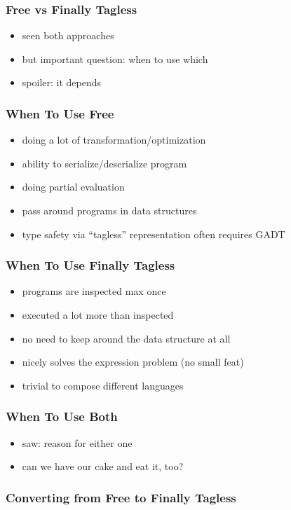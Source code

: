 \documentclass[aspectratio=169, hyperref={colorlinks, linkcolor=beamer@centricgreen}, urlcolor=links]{beamer}
\begin{document}
\begin{frame}
  \frametitle{Free vs Finally Tagless}
  \begin{itemize}
  \item seen both approaches
  \item but important question: when to use which
  \item spoiler: it depends
  \end{itemize}
\end{frame}

\begin{frame}
  \frametitle{When To Use Free}
  \begin{itemize}
  \item doing a lot of transformation/optimization
  \item ability to serialize/deserialize program
  \item doing partial evaluation
  \item pass around programs in data structures
  \item type safety via ``tagless'' representation often requires GADT
  \end{itemize}
\end{frame}

\begin{frame}
  \frametitle{When To Use Finally Tagless}
  \begin{itemize}
  \item programs are inspected max once
  \item executed a lot more than inspected
  \item no need to keep around the data structure at all
  \item nicely solves the expression problem (no small feat)
  \item trivial to compose different languages
  \end{itemize}
\end{frame}

\begin{frame}
  \frametitle{When To Use Both}
  \begin{itemize}
  \item saw: reason for either one
  \item can we have our cake and eat it, too?
  \end{itemize}
\end{frame}

\begin{frame}
  \frametitle{Converting from Free to Finally Tagless}
\end{frame}
\end{document}
